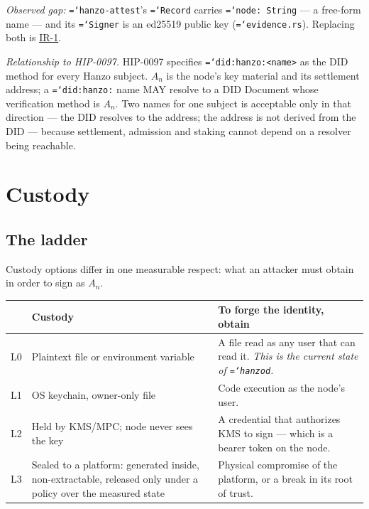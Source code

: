 \documentclass[11pt,a4paper]{article}
\newcommand{\code}[1]{\texttt{\hyphenchar\font=`\-\relax #1}}
\begin{document}
\emph{Observed gap:} \code{hanzo-attest}'s \code{Record} carries
\code{node: String} --- a free-form name --- and its \code{Signer} is an ed25519
public key (\code{evidence.rs}). Replacing both is \hyperref[sec:req]{IR-1}.

\emph{Relationship to HIP-0097.} HIP-0097 specifies \code{did:hanzo:<name>} as the
DID method for every Hanzo subject. $A_n$ is the node's key material and its
settlement address; a \code{did:hanzo:} name MAY resolve to a DID Document whose
verification method is $A_n$. Two names for one subject is acceptable only in that
direction --- the DID resolves to the address; the address is not derived from the
DID --- because settlement, admission and staking cannot depend on a resolver
being reachable.

\section{Custody}
\label{sec:custody}

\subsection{The ladder}
\label{sec:ladder}

Custody options differ in one measurable respect: what an attacker must obtain in
order to sign as $A_n$.

\begin{center}
\small
\begin{tabular}{@{}l>{\raggedright\arraybackslash}p{}>{\raggedright\arraybackslash}p{}@{}}
\toprule
& \textbf{Custody} & \textbf{To forge the identity, obtain} \\
\midrule
L0 & Plaintext file or environment variable & A file read as any user that can read it. \emph{This is the current state of \code{hanzod}.} \\
L1 & OS keychain, owner-only file & Code execution as the node's user. \\
L2 & Held by KMS/MPC; node never sees the key & A credential that authorizes KMS to sign --- which is a bearer token on the node. \\
L3 & Sealed to a platform: generated inside, non-extractable, released only under a policy over the measured state & Physical compromise of the platform, or a break in its root of trust. \\
\bottomrule
\end{tabular}
\end{center}
\end{document}
